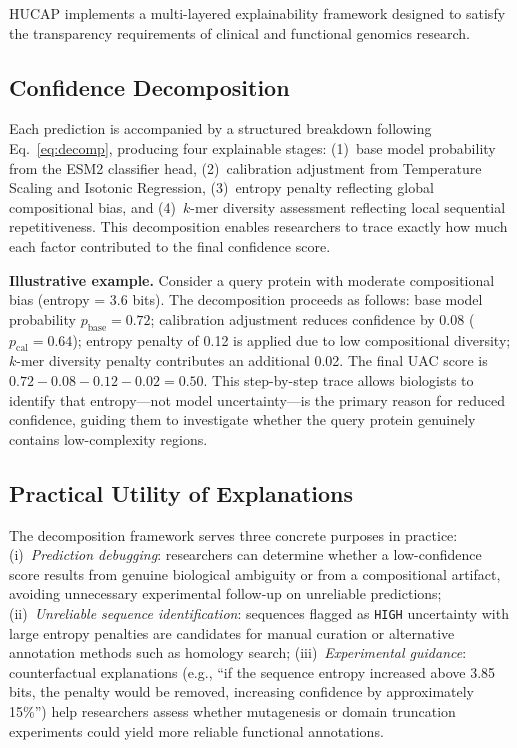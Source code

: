 \documentclass[conference]{IEEEtran}
\begin{document}
HUCAP implements a multi-layered explainability framework designed to satisfy the transparency requirements of clinical and functional genomics research.

\subsection{Confidence Decomposition}
Each prediction is accompanied by a structured breakdown following Eq.~\ref{eq:decomp}, producing four explainable stages: (1)~base model probability from the ESM2 classifier head, (2)~calibration adjustment from Temperature Scaling and Isotonic Regression, (3)~entropy penalty reflecting global compositional bias, and (4)~$k$-mer diversity assessment reflecting local sequential repetitiveness. This decomposition enables researchers to trace exactly how much each factor contributed to the final confidence score.

\textbf{Illustrative example.} Consider a query protein with moderate compositional bias (entropy = 3.6 bits). The decomposition proceeds as follows: base model probability $p_{\text{base}} = 0.72$; calibration adjustment reduces confidence by 0.08 ($p_{\text{cal}} = 0.64$); entropy penalty of 0.12 is applied due to low compositional diversity; $k$-mer diversity penalty contributes an additional 0.02. The final UAC score is $0.72 - 0.08 - 0.12 - 0.02 = 0.50$. This step-by-step trace allows biologists to identify that entropy---not model uncertainty---is the primary reason for reduced confidence, guiding them to investigate whether the query protein genuinely contains low-complexity regions.

\subsection{Practical Utility of Explanations}
The decomposition framework serves three concrete purposes in practice: (i)~\textit{Prediction debugging}: researchers can determine whether a low-confidence score results from genuine biological ambiguity or from a compositional artifact, avoiding unnecessary experimental follow-up on unreliable predictions; (ii)~\textit{Unreliable sequence identification}: sequences flagged as \texttt{HIGH} uncertainty with large entropy penalties are candidates for manual curation or alternative annotation methods such as homology search; (iii)~\textit{Experimental guidance}: counterfactual explanations (e.g., ``if the sequence entropy increased above 3.85 bits, the penalty would be removed, increasing confidence by approximately 15\%'') help researchers assess whether mutagenesis or domain truncation experiments could yield more reliable functional annotations.
\end{document}
